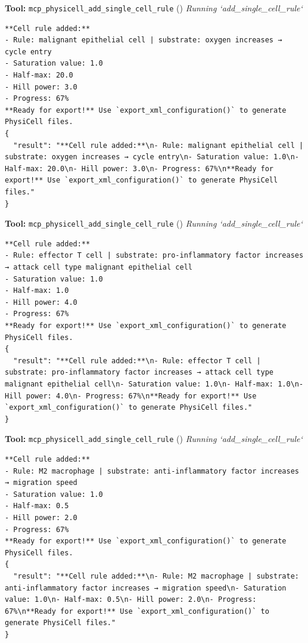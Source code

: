 \documentclass[11pt,a4paper]{article}
\begin{document}
\begin{toolokbox}
\textbf{Tool:} \texttt{mcp\_physicell\_add\_single\_cell\_rule} (\checkmark)
\textit{Running `add\_single\_cell\_rule`}
\begin{lstlisting}
**Cell rule added:**
- Rule: malignant epithelial cell | substrate: oxygen increases → cycle entry
- Saturation value: 1.0
- Half-max: 20.0
- Hill power: 3.0
- Progress: 67%
**Ready for export!** Use `export_xml_configuration()` to generate PhysiCell files.
{
  "result": "**Cell rule added:**\n- Rule: malignant epithelial cell | substrate: oxygen increases → cycle entry\n- Saturation value: 1.0\n- Half-max: 20.0\n- Hill power: 3.0\n- Progress: 67%\n**Ready for export!** Use `export_xml_configuration()` to generate PhysiCell files."
}
\end{lstlisting}
\end{toolokbox}
\begin{toolokbox}
\textbf{Tool:} \texttt{mcp\_physicell\_add\_single\_cell\_rule} (\checkmark)
\textit{Running `add\_single\_cell\_rule`}
\begin{lstlisting}
**Cell rule added:**
- Rule: effector T cell | substrate: pro-inflammatory factor increases → attack cell type malignant epithelial cell
- Saturation value: 1.0
- Half-max: 1.0
- Hill power: 4.0
- Progress: 67%
**Ready for export!** Use `export_xml_configuration()` to generate PhysiCell files.
{
  "result": "**Cell rule added:**\n- Rule: effector T cell | substrate: pro-inflammatory factor increases → attack cell type malignant epithelial cell\n- Saturation value: 1.0\n- Half-max: 1.0\n- Hill power: 4.0\n- Progress: 67%\n**Ready for export!** Use `export_xml_configuration()` to generate PhysiCell files."
}
\end{lstlisting}
\end{toolokbox}
\begin{toolokbox}
\textbf{Tool:} \texttt{mcp\_physicell\_add\_single\_cell\_rule} (\checkmark)
\textit{Running `add\_single\_cell\_rule`}
\begin{lstlisting}
**Cell rule added:**
- Rule: M2 macrophage | substrate: anti-inflammatory factor increases → migration speed
- Saturation value: 1.0
- Half-max: 0.5
- Hill power: 2.0
- Progress: 67%
**Ready for export!** Use `export_xml_configuration()` to generate PhysiCell files.
{
  "result": "**Cell rule added:**\n- Rule: M2 macrophage | substrate: anti-inflammatory factor increases → migration speed\n- Saturation value: 1.0\n- Half-max: 0.5\n- Hill power: 2.0\n- Progress: 67%\n**Ready for export!** Use `export_xml_configuration()` to generate PhysiCell files."
}
\end{lstlisting}
\end{toolokbox}
\end{document}
